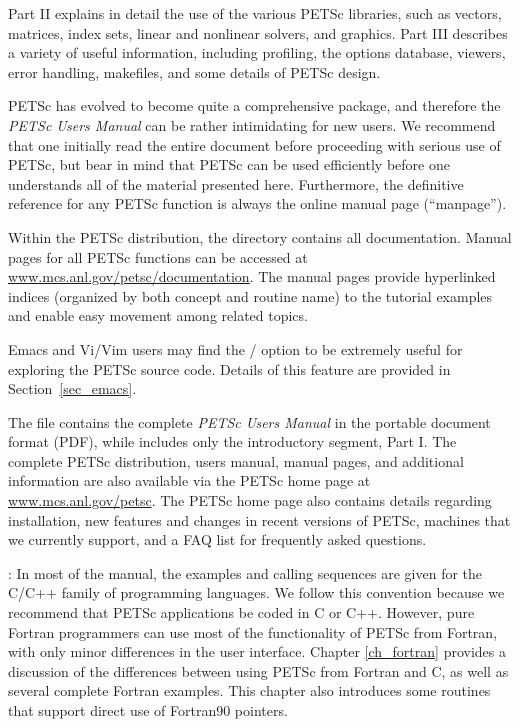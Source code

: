 Part II explains in detail the use of the various PETSc libraries,
such as vectors, matrices, index sets, linear and nonlinear
solvers, and graphics.  Part III describes a variety of useful
information, including profiling, the options database, viewers, error
handling, makefiles, and some details of
PETSc design.

\nocite{efficient}

PETSc has evolved to become quite a comprehensive package, and therefore the
{\em PETSc Users Manual} can be rather intimidating for new users. We
recommend that one initially read the entire document before proceeding with
serious use of PETSc, but bear in mind that PETSc can be used efficiently
before one understands all of the material presented here. Furthermore, the
definitive reference for any PETSc function is always the online manual page (``manpage'').

\medskip \medskip

Within the PETSc distribution, the directory 
contains all documentation.
Manual pages for all PETSc functions can be
accessed at \href{https://www.mcs.anl.gov/petsc/documentation}{www.mcs.anl.gov/petsc/documentation}.
The manual pages
provide hyperlinked indices (organized by
both concept and routine name) to the tutorial examples and enable
easy movement among related topics.

Emacs and Vi/Vim users may find the
/  option to be extremely useful for exploring the PETSc
source code.  Details of this feature are provided in
Section~\ref{sec_emacs}.

The file  contains
the complete {\em PETSc Users Manual} in the portable document format (PDF),
while 
includes only the introductory segment, Part I.  
The complete PETSc distribution, users
manual, manual pages, and additional information are also available via
the PETSc home page at
\href{http://www.mcs.anl.gov/petsc}{www.mcs.anl.gov/petsc}.
The PETSc home page also
contains details regarding installation, new features and changes in recent
versions of PETSc, machines that we currently support, and a FAQ list for frequently asked questions.

\medskip\medskip

: In most of the
manual, the examples and calling sequences are given for the C/C++
family of programming languages.  We follow this convention because we
recommend that PETSc applications be coded in C or C++.
However, pure Fortran programmers can use most of the
functionality of PETSc from Fortran, with only minor differences in
the user interface.  Chapter \ref{ch_fortran} provides a discussion of the
differences between using PETSc from Fortran and C, as well as several
complete Fortran examples.  This chapter also introduces some
routines that support direct use of Fortran90 pointers. \\

